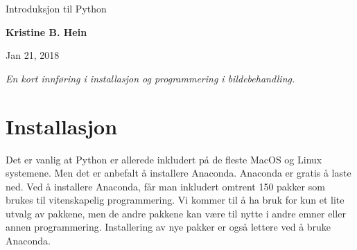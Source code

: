 \documentclass[%
oneside,                 %
final,                   %
10pt,norsk]{article}
\begin{document}

\newcommand{\exercisesection}[1]{\subsection*{#1}}






\thispagestyle{empty}

\begin{center}
{\LARGE\bf
\begin{spacing}{1.25}
{\color{seccolor} Introduksjon til Python}
\end{spacing}
}
\end{center}


\begin{center}
{\bf Kristine B. Hein${}^{}$} \\ [0mm]
\end{center}

\begin{center}
\end{center}
    

\begin{center}
Jan 21, 2018
\end{center}

\vspace{1cm}


\emph{En kort innføring i installasjon og programmering i bildebehandling.}




\tableofcontents


\vspace{1cm} %




\section{Installasjon}
Det er vanlig at Python er allerede inkludert på de fleste MacOS og Linux systemene.
Men det er anbefalt å installere Anaconda. Anaconda er gratis å laste ned. Ved å installere Anaconda, får man inkludert omtrent 150 pakker som brukes til vitenskapelig programmering. Vi kommer til å ha bruk for kun et lite utvalg av pakkene, men de andre pakkene kan være til nytte i andre emner eller annen programmering.
Installering av nye pakker er også lettere ved å bruke Anaconda.
\end{document}
